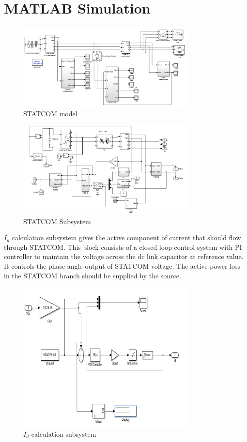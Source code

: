 \documentclass[journal,twoside]{IEEEtran}
\begin{document}
\section{MATLAB Simulation}
\begin{figure}[!ht]
\includegraphics[width=3.5in]{2}
\caption{STATCOM model}
\label{f2}
\end{figure}

\begin{figure}[!ht]
\includegraphics[width=3.5in]{3}
\caption{STATCOM Subsystem}
\label{f3}
\end{figure}
$I_d$ calculation subsystem gives the active
component of current that should flow through
STATCOM. This block consists of a closed loop
control system with PI controller to maintain the
voltage across the dc link capacitor at reference
value. It controls the phase angle output of
STATCOM voltage. The active power loss in the
STATCOM branch should be supplied by the
source.
\begin{figure}[!ht]
\includegraphics[width=3.5in]{4}
\caption{$I_d$ calculation subsystem}
\label{f4}
\end{figure}
\end{document}
